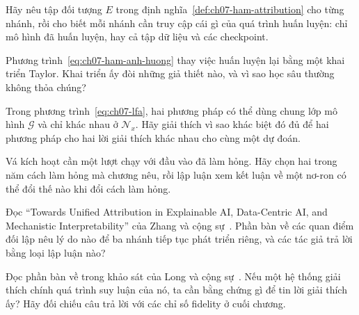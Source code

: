 \cauhoi
\begin{cauhoids}
  \item Hãy nêu tập đối tượng $E$ trong định nghĩa~\ref{def:ch07-ham-attribution}
  cho từng nhánh, rồi cho biết mỗi nhánh cần truy cập cái gì của quá trình huấn
  luyện: chỉ mô hình đã huấn luyện, hay cả tập dữ liệu và các checkpoint.
  \item Phương trình~\ref{eq:ch07-ham-anh-huong} thay việc huấn luyện lại bằng
  một khai triển Taylor. Khai triển ấy đòi những giả thiết nào, và vì sao học sâu
  thường không thỏa chúng?
  \item Trong phương trình~\ref{eq:ch07-lfa}, hai phương pháp có thể dùng chung
  lớp mô hình $\mathcal{G}$ và chỉ khác nhau ở $\mathcal{N}_x$. Hãy giải thích vì
  sao khác biệt đó đủ để hai phương pháp cho hai lời giải thích khác nhau cho
  cùng một dự đoán.
  \item Vá kích hoạt cần một lượt chạy với đầu vào đã làm hỏng. Hãy chọn hai
  trong năm cách làm hỏng mà chương nêu, rồi lập luận xem kết luận về một nơ-ron
  có thể đổi thế nào khi đổi cách làm hỏng.
  \item Đọc \enquote{Towards Unified Attribution in Explainable AI, Data-Centric
  AI, and Mechanistic Interpretability} của Zhang và cộng
  sự~\autocite{p18unified}. Phần bàn về các quan điểm đối lập nêu lý do nào để ba
  nhánh tiếp tục phát triển riêng, và các tác giả trả lời bằng loại lập luận nào?
  \item Đọc phần bàn về  trong khảo sát của
  Long và cộng sự~\autocite{p20trends}. Nếu một hệ thống giải thích chính quá trình suy luận
  của nó, ta cần bằng chứng gì để tin lời giải thích ấy? Hãy đối chiếu câu trả
  lời với các chỉ số fidelity ở cuối chương.
\end{cauhoids}
